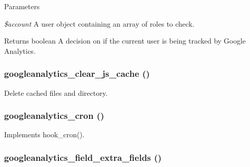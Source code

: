 \begin{DoxyParams}{Parameters}
\item[{\em \$account}]A user object containing an array of roles to check. \end{DoxyParams}
\begin{DoxyReturn}{Returns}
boolean A decision on if the current user is being tracked by Google Analytics. 
\end{DoxyReturn}
\hypertarget{googleanalytics_8module_ade82c3b418d046e498a1e2cc6b075756}{
\subsubsection[{googleanalytics\_\-clear\_\-js\_\-cache}]{\setlength{\rightskip}{0pt plus 5cm}googleanalytics\_\-clear\_\-js\_\-cache ()}}
\label{googleanalytics_8module_ade82c3b418d046e498a1e2cc6b075756}
Delete cached files and directory. \hypertarget{googleanalytics_8module_aa413822743813597fe3944c364d03006}{
\subsubsection[{googleanalytics\_\-cron}]{\setlength{\rightskip}{0pt plus 5cm}googleanalytics\_\-cron ()}}
\label{googleanalytics_8module_aa413822743813597fe3944c364d03006}
Implements hook\_\-cron(). \hypertarget{googleanalytics_8module_a7280096e9cb3e2b5f020f9f31dbfcfd1}{
\subsubsection[{googleanalytics\_\-field\_\-extra\_\-fields}]{\setlength{\rightskip}{0pt plus 5cm}googleanalytics\_\-field\_\-extra\_\-fields ()}}
\label{googleanalytics_8module_a7280096e9cb3e2b5f020f9f31dbfcfd1}
